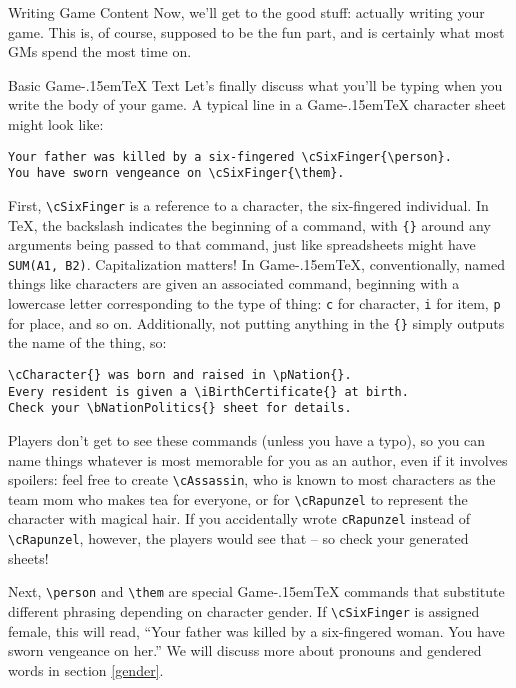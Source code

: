 \documentclass[11pt]{article}
\def\gametex{\mbox{Game\kern-.15em\TeX}}
\begin{document}
\begin{section}{Writing Game Content}
Now, we'll get to the good stuff: actually writing your game.  This is, of course, supposed to be the fun part, and is certainly what most GMs spend the most time on.

\begin{subsection}{Basic \gametex{} Text}
Let's finally discuss what you'll be typing when you write the body of your game.
A typical line in a \gametex{} character sheet might look like:
\begin{verbatim}
Your father was killed by a six-fingered \cSixFinger{\person}.  
You have sworn vengeance on \cSixFinger{\them}.
\end{verbatim}

First, \lstinline{\cSixFinger} is a reference to a character, the six-fingered individual.  In \TeX{}, the backslash indicates the beginning of a command, with \lstinline|{}| around any arguments being passed to that command, just like spreadsheets might have \texttt{SUM(A1, B2)}.  Capitalization matters!  In \gametex{}, conventionally, named things like characters are given an associated command, beginning with a lowercase letter corresponding to the type of thing: \lstinline{c} for character, \lstinline{i} for item, \lstinline{p} for place, and so on.  Additionally, not putting anything in the \lstinline|{}| simply outputs the name of the thing, so: 
\begin{verbatim}
\cCharacter{} was born and raised in \pNation{}.
Every resident is given a \iBirthCertificate{} at birth.
Check your \bNationPolitics{} sheet for details.
\end{verbatim}

Players don't get to see these commands (unless you have a typo), so you can name things whatever is most memorable for you as an author, even if it involves spoilers: feel free to create \lstinline|\cAssassin|, who is known to most characters as the team mom who makes tea for everyone, or for \lstinline{\cRapunzel} to represent the character with magical hair.  If you accidentally wrote \lstinline{cRapunzel} instead of \lstinline{\cRapunzel}, however, the players would see that -- so check your generated sheets!

Next, \lstinline{\person} and \lstinline{\them} are special \gametex{} commands that substitute different phrasing depending on character gender.  If \lstinline{\cSixFinger} is assigned female, this will read, ``Your father was killed by a six-fingered woman.  You have sworn vengeance on her.''  We will discuss more about pronouns and gendered words in section \ref{gender}.


\end{subsection}
\end{section}
\end{document}
